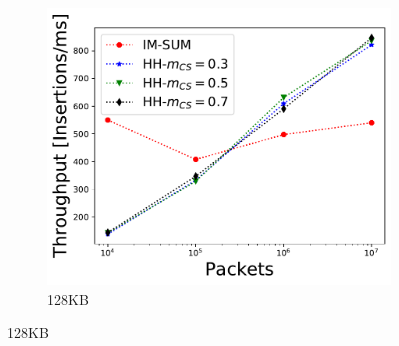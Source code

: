 \begin{figure}
\begin{subfigure}[t]{0.32\textwidth}
    \includegraphics[width=\linewidth]{HH/figures/throughput_per_pkts_m=0.125.pdf}
    \caption{128KB}
    \label{fig:fig4_c}
\end{subfigure}


\end{figure}
